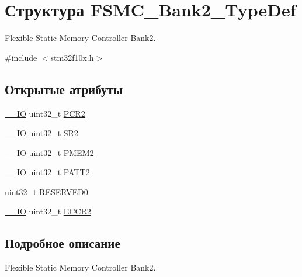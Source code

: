 \hypertarget{struct_f_s_m_c___bank2___type_def}{}\section{Структура F\+S\+M\+C\+\_\+\+Bank2\+\_\+\+Type\+Def}
\label{struct_f_s_m_c___bank2___type_def}


Flexible Static Memory Controller Bank2.  




{\ttfamily \#include $<$stm32f10x.\+h$>$}

\subsection*{Открытые атрибуты}
\begin{DoxyCompactItemize}
\item 
\mbox{\hyperlink{group___c_m_s_i_s___c_m3__core__definitions_gaec43007d9998a0a0e01faede4133d6be}{\+\_\+\+\_\+\+IO}} uint32\+\_\+t \mbox{\hyperlink{struct_f_s_m_c___bank2___type_def_ad1eabc89a4eadb5cc6a42c1e39a39ff8}{P\+C\+R2}}
\item 
\mbox{\hyperlink{group___c_m_s_i_s___c_m3__core__definitions_gaec43007d9998a0a0e01faede4133d6be}{\+\_\+\+\_\+\+IO}} uint32\+\_\+t \mbox{\hyperlink{struct_f_s_m_c___bank2___type_def_a38ad7403e05c899dc266cf47f932cc8f}{S\+R2}}
\item 
\mbox{\hyperlink{group___c_m_s_i_s___c_m3__core__definitions_gaec43007d9998a0a0e01faede4133d6be}{\+\_\+\+\_\+\+IO}} uint32\+\_\+t \mbox{\hyperlink{struct_f_s_m_c___bank2___type_def_a29b2b75e74520e304e31c18cf9e4a7f8}{P\+M\+E\+M2}}
\item 
\mbox{\hyperlink{group___c_m_s_i_s___c_m3__core__definitions_gaec43007d9998a0a0e01faede4133d6be}{\+\_\+\+\_\+\+IO}} uint32\+\_\+t \mbox{\hyperlink{struct_f_s_m_c___bank2___type_def_a9b2c273e4b84f24efbd731bd4ba76a84}{P\+A\+T\+T2}}
\item 
uint32\+\_\+t \mbox{\hyperlink{struct_f_s_m_c___bank2___type_def_ac0433330a92f2bd04812384f63bb4a52}{R\+E\+S\+E\+R\+V\+E\+D0}}
\item 
\mbox{\hyperlink{group___c_m_s_i_s___c_m3__core__definitions_gaec43007d9998a0a0e01faede4133d6be}{\+\_\+\+\_\+\+IO}} uint32\+\_\+t \mbox{\hyperlink{struct_f_s_m_c___bank2___type_def_afebea17b3ac79d86ad59ce299ab5dd83}{E\+C\+C\+R2}}
\end{DoxyCompactItemize}


\subsection{Подробное описание}
Flexible Static Memory Controller Bank2. 

